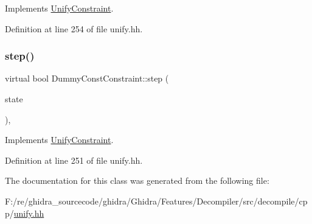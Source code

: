 Implements \mbox{\hyperlink{class_unify_constraint_a774f6a611a96384766cb8e8d8f5ff41f}{Unify\+Constraint}}.



Definition at line 254 of file unify.\+hh.

\mbox{\label{class_dummy_const_constraint_a3c0468211fcda260305a430622872e72}} 
\subsubsection{\texorpdfstring{step()}{step()}}
{\footnotesize\ttfamily virtual bool Dummy\+Const\+Constraint\+::step (\begin{DoxyParamCaption}\item[{\mbox{\hyperlink{class_unify_state}{Unify\+State}} \&}]{state }\end{DoxyParamCaption})\hspace{0.3cm}{\ttfamily [inline]}, {\ttfamily [virtual]}}



Implements \mbox{\hyperlink{class_unify_constraint_ad9ab4ad91037f96bf803735d414d212d}{Unify\+Constraint}}.



Definition at line 251 of file unify.\+hh.



The documentation for this class was generated from the following file\+:\begin{DoxyCompactItemize}
\item 
F\+:/re/ghidra\+\_\+sourcecode/ghidra/\+Ghidra/\+Features/\+Decompiler/src/decompile/cpp/\mbox{\hyperlink{unify_8hh}{unify.\+hh}}\end{DoxyCompactItemize}
